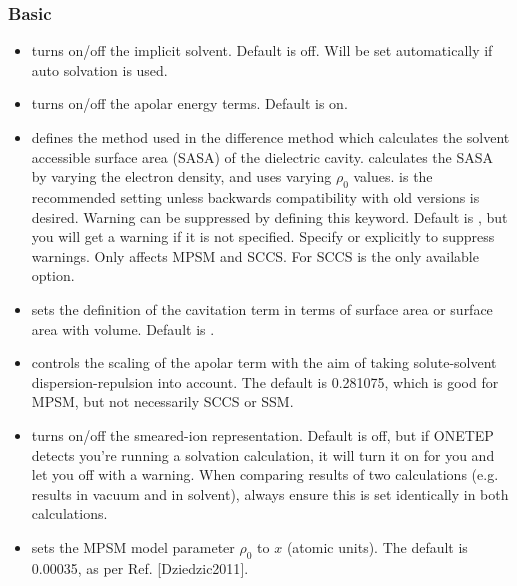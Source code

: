 \documentclass[letterpaper,10pt,english]{sphinxmanual}
\begin{document}
\subsubsection{Basic}
\label{\detokenize{implicit_solvation_v3:basic}}\begin{itemize}
\item {} 
 turns on/off the implicit solvent.
Default is off. Will be set automatically if auto solvation is used.

\item {} 
 turns on/off the apolar energy terms.
Default is on.

\item {} 
 defines the method
used in the difference method which calculates the solvent accessible
surface area (SASA) of the dielectric cavity.  calculates
the SASA by varying the electron density, and  uses
varying \(\rho_0\) values.  is the recommended setting
unless backwards compatibility with old versions is desired. Warning
can be suppressed by defining this keyword. Default is , but
you will get a warning if it is not specified. Specify  or
 explicitly to suppress warnings. Only affects MPSM and
SCCS. For SCCS  is the only available option.

\item {} 
 sets the definition of the cavitation
term in terms of surface area or surface area with volume. Default is
.

\item {} 
 controls the scaling of the apolar
term with the aim of taking solute-solvent dispersion-repulsion into
account. The default is 0.281075, which is good for MPSM, but not
necessarily SCCS or SSM.

\item {} 
 turns on/off the smeared-ion
representation. Default is off, but if ONETEP detects you’re running
a solvation calculation, it will turn it on for you and let you off
with a warning. When comparing results of two calculations (e.g.
results in vacuum and in solvent), always ensure this is set
identically in both calculations.

\item {} 
 sets the MPSM model parameter
\(\rho_{0}\) to \(x\) (atomic units). The default is 0.00035,
as per Ref. {[}Dziedzic2011{]}.


\end{itemize}
\end{document}
